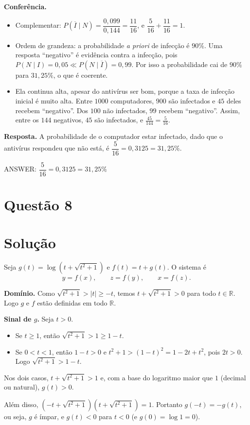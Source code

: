 \documentclass{article}%
\begin{document}
\textbf{Conferência.}
\begin{itemize}
\item Complementar: $P(\overline{I}\mid N)=\dfrac{0{,}099}{0{,}144}=\dfrac{11}{16}$, e $\dfrac{5}{16}+\dfrac{11}{16}=1$.
\item Ordem de grandeza: a probabilidade \emph{a priori} de infecção é $90\%$. Uma resposta ``negativo'' é evidência contra a infecção, pois $P(N\mid I)=0{,}05\ll P(N\mid\overline I)=0{,}99$. Por isso a probabilidade cai de $90\%$ para $31{,}25\%$, o que é coerente.
\item Ela continua alta, apesar do antivírus ser bom, porque a taxa de infecção inicial é muito alta. Entre $1000$ computadores, $900$ são infectados e $45$ deles recebem ``negativo''. Dos $100$ não infectados, $99$ recebem ``negativo''. Assim, entre os $144$ negativos, $45$ são infectados, e $\frac{45}{144}=\frac{5}{16}$.
\end{itemize}

\textbf{Resposta.} A probabilidade de o computador estar infectado, dado que o antivírus respondeu que não está, é $\dfrac{5}{16}=0{,}3125=31{,}25\%$.

ANSWER: $\dfrac{5}{16}=0{,}3125=31{,}25\%$%
\newpage%
\section*{Questão 8}

\section*{Solução}

Seja $g(t)=\log\!\left(t+\sqrt{t^{2}+1}\right)$ e $f(t)=t+g(t)$. O sistema é
\[
y=f(x),\qquad z=f(y),\qquad x=f(z).
\]

\textbf{Domínio.} Como $\sqrt{t^2+1}>|t|\ge -t$, temos $t+\sqrt{t^2+1}>0$ para todo $t\in\mathbb{R}$. Logo $g$ e $f$ estão definidas em todo $\mathbb{R}$.

\textbf{Sinal de $g$.} Seja $t>0$.
\begin{itemize}
\item Se $t\ge 1$, então $\sqrt{t^2+1}>1\ge 1-t$.
\item Se $0<t<1$, então $1-t>0$ e $t^2+1>(1-t)^2=1-2t+t^2$, pois $2t>0$. Logo $\sqrt{t^2+1}>1-t$.
\end{itemize}
Nos dois casos, $t+\sqrt{t^2+1}>1$ e, com a base do logaritmo maior que $1$ (decimal ou natural), $g(t)>0$.

Além disso, $\left(-t+\sqrt{t^2+1}\right)\left(t+\sqrt{t^2+1}\right)=1$. Portanto $g(-t)=-g(t)$, ou seja, $g$ é ímpar, e $g(t)<0$ para $t<0$ (e $g(0)=\log 1=0$).
\end{document}

